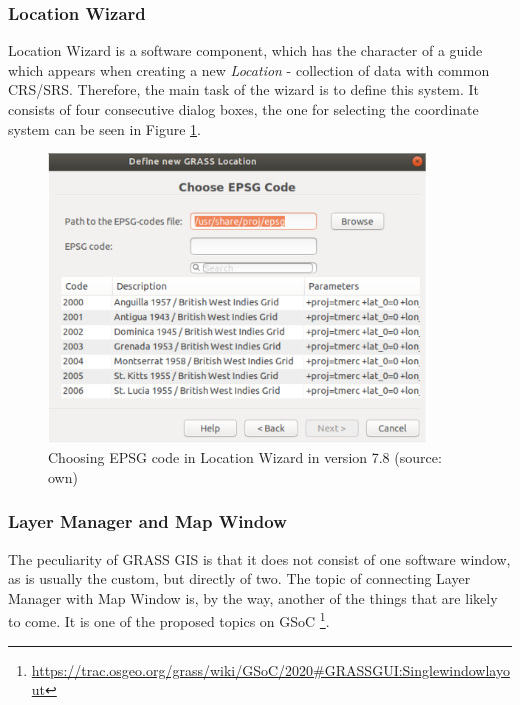 \documentclass[a4paper,10pt,twoside]{article}
\begin{document}
\subsubsection{Location Wizard}
\label{subsection:wizard}
\noindent
\large
Location Wizard is a software component, which has the character of a guide which appears when creating a new \textit{Location} - collection of data with common CRS/SRS. Therefore, the main task of the wizard is to define this system. It consists of four consecutive dialog boxes, the one for selecting the coordinate system can be seen in Figure \ref{fig:loc_wizard_sour_pred}.

\vspace{0.3cm}
\begin{figure}[hbt!]
\begin{center}
\includegraphics[width=10cm]{../pictures/loc_wizard_sour_pred.png} 
\caption[Choosing EPSG code in Location Wizard in version 7.8]{Choosing EPSG code in Location Wizard in version 7.8 (source: own)}
\label{fig:loc_wizard_sour_pred}
\end{center}
\end{figure}

\newpage
\vspace*{-1cm}
\subsubsection{Layer Manager and Map Window}

\noindent The peculiarity of GRASS GIS is that it does not consist of one software window, as is usually the custom, but directly of two. The topic of connecting Layer Manager with Map Window is, by the way, another of the things that are likely to come. It is one of the proposed topics on GSoC \footnote{\url{https://trac.osgeo.org/grass/wiki/GSoC/2020\#GRASSGUI:Singlewindowlayout}}.
\end{document}
